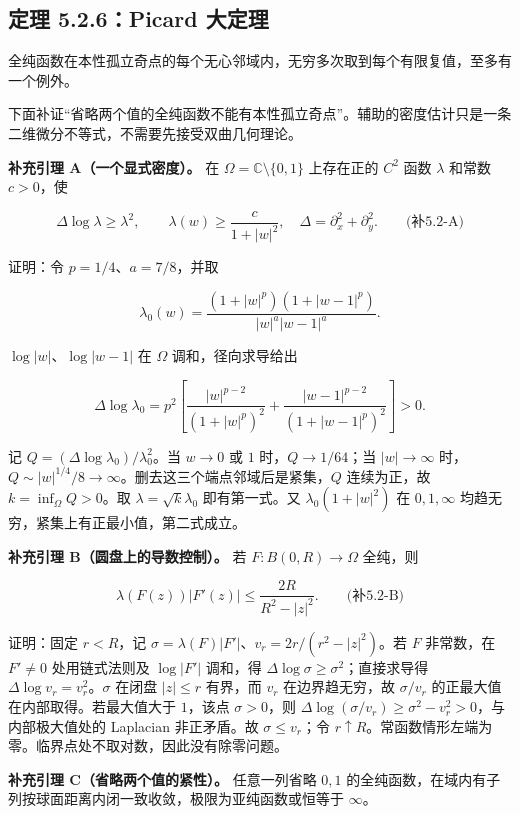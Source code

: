 \documentclass[11pt,a4paper]{article}
\begin{document}
\subsection{定理 5.2.6：Picard 大定理}\label{ch05-s2-heading-3}

全纯函数在本性孤立奇点的每个无心邻域内，无穷多次取到每个有限复值，至多有一个例外。

下面补证``省略两个值的全纯函数不能有本性孤立奇点''。辅助的密度估计只是一条二维微分不等式，不需要先接受双曲几何理论。

\textbf{补充引理 A（一个显式密度）。} 在
\(\Omega=\mathbb C\setminus\{0,1\}\) 上存在正的 \(C^2\) 函数 \(\lambda\)
和常数 \(c>0\)，使

\[
\Delta\log\lambda\ge\lambda^2,
\qquad \lambda(w)\ge\frac{c}{1+|w|^2},
\quad \Delta=\partial_x^2+\partial_y^2.
\qquad\text{(补5.2-A)}
\]

证明：令 \(p=1/4\)、\(a=7/8\)，并取

\[
\lambda_0(w)=\frac{(1+|w|^p)(1+|w-1|^p)}{|w|^a|w-1|^a}.
\]

\(\log|w|\)、\(\log|w-1|\) 在 \(\Omega\) 调和，径向求导给出

\[
\Delta\log\lambda_0
=p^2\left[\frac{|w|^{p-2}}{(1+|w|^p)^2}
+\frac{|w-1|^{p-2}}{(1+|w-1|^p)^2}\right]>0.
\]

记 \(Q=(\Delta\log\lambda_0)/\lambda_0^2\)。当 \(w\to0\) 或 \(1\)
时，\(Q\to1/64\)；当 \(|w|\to\infty\)
时，\(Q\sim |w|^{1/4}/8\to\infty\)。删去这三个端点邻域后是紧集，\(Q\)
连续为正，故 \(k=\inf_\Omega Q>0\)。取 \(\lambda=\sqrt{k}\lambda_0\)
即有第一式。又 \(\lambda_0(1+|w|^2)\) 在 \(0,1,\infty\)
均趋无穷，紧集上有正最小值，第二式成立。

\textbf{补充引理 B（圆盘上的导数控制）。} 若 \(F:B(0,R)\to\Omega\)
全纯，则

\[
\lambda(F(z))|F'(z)|\le\frac{2R}{R^2-|z|^2}.
\qquad\text{(补5.2-B)}
\]

证明：固定 \(r<R\)，记
\(\sigma=\lambda(F)|F'|\)、\(v_r=2r/(r^2-|z|^2)\)。若 \(F\) 非常数，在
\(F'\ne0\) 处用链式法则及 \(\log|F'|\) 调和，得
\(\Delta\log\sigma\ge\sigma^2\)；直接求导得
\(\Delta\log v_r=v_r^2\)。\(\sigma\) 在闭盘 \(|z|\le r\) 有界，而
\(v_r\) 在边界趋无穷，故 \(\sigma/v_r\)
的正最大值在内部取得。若最大值大于 \(1\)，该点 \(\sigma>0\)，则
\(\Delta\log(\sigma/v_r)\ge\sigma^2-v_r^2>0\)，与内部极大值处的
Laplacian 非正矛盾。故 \(\sigma\le v_r\)；令
\(r\uparrow R\)。常函数情形左端为零。临界点处不取对数，因此没有除零问题。

\textbf{补充引理 C（省略两个值的紧性）。} 任意一列省略 \(0,1\)
的全纯函数，在域内有子列按球面距离内闭一致收敛，极限为亚纯函数或恒等于
\(\infty\)。
\end{document}

